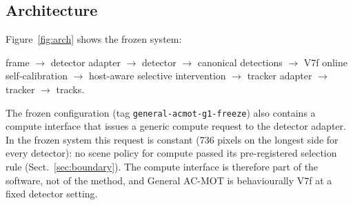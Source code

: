 \documentclass[pdflatex,sn-mathphys-num]{sn-jnl}
\begin{document}
\subsection{Architecture}\label{sec:arch}
Figure~\ref{fig:arch} shows the frozen system:
\begin{center}
frame $\rightarrow$ detector adapter $\rightarrow$ detector $\rightarrow$ canonical detections $\rightarrow$ V7f online self-calibration $\rightarrow$ host-aware selective intervention $\rightarrow$ tracker adapter $\rightarrow$ tracker $\rightarrow$ tracks.
\end{center}
The frozen configuration (tag \texttt{general-acmot-g1-freeze}) also contains a compute interface that issues a generic compute request to the detector adapter. In the frozen system this request is constant (736 pixels on the longest side for every detector): no scene policy for compute passed its pre-registered selection rule (Sect.~\ref{sec:boundary}). The compute interface is therefore part of the software, not of the method, and General AC-MOT is behaviourally V7f at a fixed detector setting.
\end{document}
